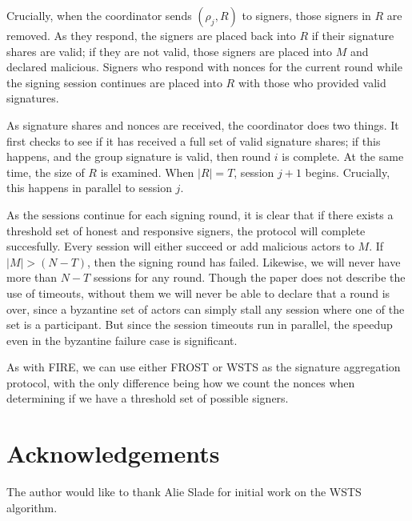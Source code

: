 \documentclass{article}
\theoremstyle{plain}
\theoremstyle{definition}
\theoremstyle{remark}
\begin{document}
Crucially, when the coordinator sends $(\rho_j, R)$ to signers, those signers in $R$ are removed.  As they respond, the signers are placed back into $R$ if their signature shares are valid; if they are not valid, those signers are placed into $M$ and declared malicious.  Signers who respond with nonces for the current round while the signing session continues are placed into $R$ with those who provided valid signatures.

As signature shares and nonces are received, the coordinator does two things.  It first checks to see if it has received a full set of valid signature shares; if this happens, and the group signature is valid, then round $i$ is complete.  At the same time, the size of $R$ is examined.  When $|R| = T$, session $j+1$ begins.  Crucially, this happens in parallel to session $j$.

As the sessions continue for each signing round, it is clear that if there exists a threshold set of honest and responsive signers, the protocol will complete succesfully.  Every session will either succeed or add malicious actors to $M$.  If $|M| > (N-T)$, then the signing round has failed.  Likewise, we will never have more than $N-T$ sessions for any round.  Though the paper does not describe the use of timeouts, without them we will never be able to declare that a round is over, since a byzantine set of actors can simply stall any session where one of the set is a participant.  But since the session timeouts run in parallel, the speedup even in the byzantine failure case is significant.

As with FIRE, we can use either FROST or WSTS as the signature aggregation protocol, with the only difference being how we count the nonces when determining if we have a threshold set of possible signers.

\section{
  Acknowledgements
}

The author would like to thank Alie Slade for initial work on the WSTS algorithm.
\end{document}
